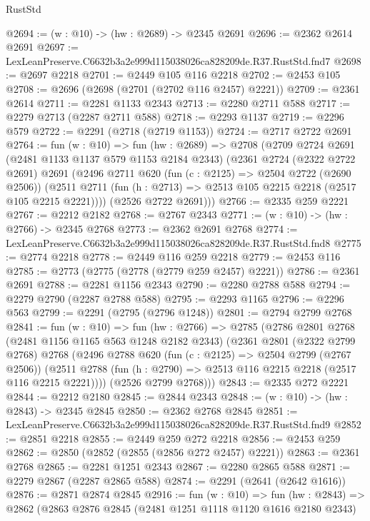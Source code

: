 \begin{lexlean}{RustStd}
\begin{coremodule}
@2694 := (w : @10) -> (hw : @2689) -> @2345 @2691
@2696 := @2362 @2614 @2691
@2697 := LexLeanPreserve.C6632b3a2e999d115038026ca828209de.R37.RustStd.fnd7
@2698 := @2697 @2218
@2701 := @2449 @105 @116 @2218
@2702 := @2453 @105
@2708 := @2696 (@2698 (@2701 (@2702 @116 @2457) @2221))
@2709 := @2361 @2614
@2711 := @2281 @1133 @2343
@2713 := @2280 @2711 @588
@2717 := @2279 @2713 (@2287 @2711 @588)
@2718 := @2293 @1137
@2719 := @2296 @579
@2722 := @2291 (@2718 (@2719 @1153))
@2724 := @2717 @2722 @2691
@2764 := fun (w : @10) =>
  fun (hw : @2689) =>
  @2708
    (@2709
      @2724
      @2691
      (@2481 @1133 @1137 @579 @1153 @2184 @2343)
      (@2361
        @2724
        (@2322 @2722 @2691)
        @2691
        (@2496
          @2711
          @620
          (fun (c : @2125) => @2504 @2722 (@2690 @2506))
          (@2511 @2711 (fun (h : @2713) => @2513 @105 @2215 @2218 (@2517 @105 @2215 @2221))))
        (@2526 @2722 @2691)))
@2766 := @2335 @259 @2221
@2767 := @2212 @2182
@2768 := @2767 @2343
@2771 := (w : @10) -> (hw : @2766) -> @2345 @2768
@2773 := @2362 @2691 @2768
@2774 := LexLeanPreserve.C6632b3a2e999d115038026ca828209de.R37.RustStd.fnd8
@2775 := @2774 @2218
@2778 := @2449 @116 @259 @2218
@2779 := @2453 @116
@2785 := @2773 (@2775 (@2778 (@2779 @259 @2457) @2221))
@2786 := @2361 @2691
@2788 := @2281 @1156 @2343
@2790 := @2280 @2788 @588
@2794 := @2279 @2790 (@2287 @2788 @588)
@2795 := @2293 @1165
@2796 := @2296 @563
@2799 := @2291 (@2795 (@2796 @1248))
@2801 := @2794 @2799 @2768
@2841 := fun (w : @10) =>
  fun (hw : @2766) =>
  @2785
    (@2786
      @2801
      @2768
      (@2481 @1156 @1165 @563 @1248 @2182 @2343)
      (@2361
        @2801
        (@2322 @2799 @2768)
        @2768
        (@2496
          @2788
          @620
          (fun (c : @2125) => @2504 @2799 (@2767 @2506))
          (@2511 @2788 (fun (h : @2790) => @2513 @116 @2215 @2218 (@2517 @116 @2215 @2221))))
        (@2526 @2799 @2768)))
@2843 := @2335 @272 @2221
@2844 := @2212 @2180
@2845 := @2844 @2343
@2848 := (w : @10) -> (hw : @2843) -> @2345 @2845
@2850 := @2362 @2768 @2845
@2851 := LexLeanPreserve.C6632b3a2e999d115038026ca828209de.R37.RustStd.fnd9
@2852 := @2851 @2218
@2855 := @2449 @259 @272 @2218
@2856 := @2453 @259
@2862 := @2850 (@2852 (@2855 (@2856 @272 @2457) @2221))
@2863 := @2361 @2768
@2865 := @2281 @1251 @2343
@2867 := @2280 @2865 @588
@2871 := @2279 @2867 (@2287 @2865 @588)
@2874 := @2291 (@2641 (@2642 @1616))
@2876 := @2871 @2874 @2845
@2916 := fun (w : @10) =>
  fun (hw : @2843) =>
  @2862
    (@2863
      @2876
      @2845
      (@2481 @1251 @1118 @1120 @1616 @2180 @2343)

\end{coremodule}
\end{lexlean}

